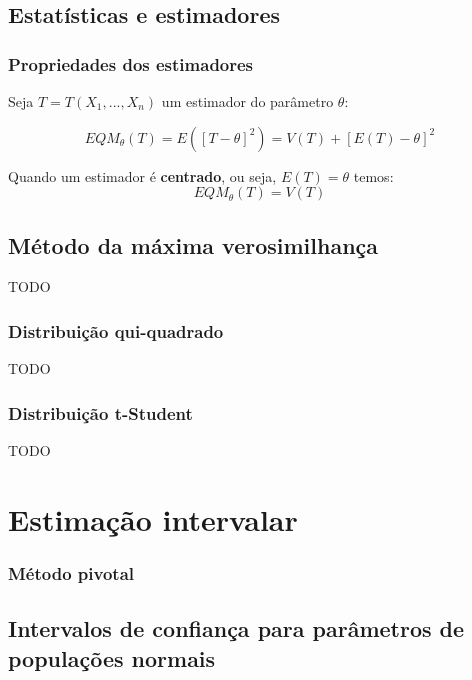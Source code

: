 \documentclass[11pt, a4paper]{article}
\begin{document}
\subsection{Estatísticas e estimadores}


\subsubsection*{Propriedades dos estimadores}

Seja $T = T(X_1, ..., X_n)$ um estimador do parâmetro $\theta$:

\begin{equation*}
    EQM_\theta (T) = E\left([T - \theta]^2\right)
    = V(T) + \left[E(T) - \theta\right]^2
\end{equation*}

Quando um estimador é \textbf{centrado}, ou seja, $E(T) = \theta$ temos:
\begin{equation*}
    EQM_\theta (T) = V(T)
\end{equation*}


\subsection{Método da máxima verosimilhança}

TODO

\subsubsection*{Distribuição qui-quadrado}

TODO

\subsubsection*{Distribuição t-Student}

TODO

\newpage
\section{Estimação intervalar}

\subsubsection*{Método pivotal}

\subsection{Intervalos de confiança para parâmetros de populações normais}
\end{document}
